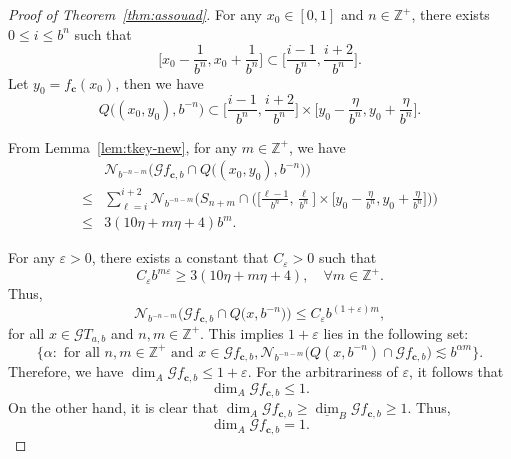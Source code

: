 \documentclass{amsart}
\theoremstyle{definition}
\theoremstyle{remark}
\numberwithin{equation}{section}
\newcommand{\Z}{{\mathbb Z}}
\def\N{\mathcal{N}}
\def\vep{\varepsilon}
\def\g{\mathcal{G}}
\def\bfc{\mathbf{c}}
\begin{document}
\begin{proof}[Proof of Theorem~\ref{thm:assouad}]



For any $x_0 \in [0,1]$ and $n \in \mathbb{Z}^+$,
there exists $0 \leq i \leq b^n$ such that
$$\Big[x_0-\frac{1}{b^n},x_0+\frac{1}{b^n}\Big]  \subset \Big[ \frac{i-1}{b^n},\frac{i+2}{ b^n} \Big]. $$
Let $y_0=f_\bfc(x_0)$, then we have
$$
	Q\big((x_0,y_0),b^{-n}\big) 
	\subset \Big[ \frac{i-1}{b^n},\frac{i+2}{ b^n} \Big] \times  \Big[y_0- \frac{\eta}{b^n},y_0+\frac{\eta}{ b^n} \Big].
$$









From Lemma~\ref{lem:tkey-new}, for any $m \in \mathbb{Z}^+$, we have
\begin{align*}
	&\N_{b^{-n-m}} \Big( \g f_{\bfc,b} \cap Q\big((x_0,y_0),b^{-n}\big) \Big) \\
	\leq& \sum_{\ell=i}^{i+2} \N_{b^{-n-m}} \bigg( S_{n+m} \cap \Big(\Big[\frac{\ell-1}{b^n},\frac{\ell}{b^n}\Big] \times \Big[y_0- \frac{\eta}{b^n},y_0+\frac{\eta}{b^n} \Big] \Big) \bigg) \\
	\leq &  3(10\eta +m \eta +4  )  b^m.
\end{align*}

For any $\vep>0$, there exists a constant that $C_\vep>0$ such that 
$$C_\vep b^{m\vep} \geq 3(10\eta +m \eta +4  )  ,\quad \forall m \in \Z^+.$$ 
Thus,
$$\N_{b^{-n-m}} \Big( \g f_{\bfc,b} \cap Q\big( x,b^{-n}\big) \Big) \leq C_\vep b^{(1+\vep)m},$$
for all $x \in \g T_{a,b}$ and $n,m \in \Z^+$.
This implies $1+\vep$ lies in the following set:
$$
	\big\{ \alpha:  \mbox{ for all } n,m \in \Z^+ \mbox{ and } x \in \g f_{\bfc,b} ,
\N_{b^{-n-m}}\big(Q(x,b^{-n})\cap  \g f_{\bfc,b}  \big) \lesssim  b^{\alpha m}  \big\}.
$$
Therefore, we have $ \dim_A \g  f_{\bfc,b} \leq  1 +\vep$.
For the arbitrariness of $\vep$, it follows that
$$\dim_A \g f_{\bfc,b}  \leq 1.$$
On the other hand,
it is clear that $\dim_A \g  f_{\bfc,b} \geq \underline\dim_B \g  f_{\bfc,b} \geq 1$.
Thus, $$\dim_A \g  f_{\bfc,b}=1.$$
\end{proof}
\end{document}
